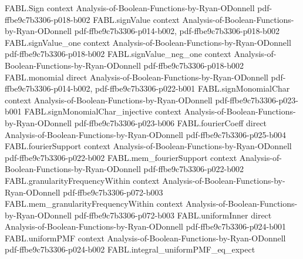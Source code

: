 \begin{theorem}
\label{FABL.FiniteFourierBasis.productTotalInfluence_eq_sum_order_mul_sq_fourierCoeff}
\leanok
{}
\proofstep
  {FABL.Sign}
  {context}
  {Analysis-of-Boolean-Functions-by-Ryan-ODonnell}
  {pdf-ffbe9c7b3306-p018-b002}
\proofstep
  {FABL.signValue}
  {context}
  {Analysis-of-Boolean-Functions-by-Ryan-ODonnell}
  {pdf-ffbe9c7b3306-p014-b002,
    pdf-ffbe9c7b3306-p018-b002}
\proofstep
  {FABL.signValue_one}
  {context}
  {Analysis-of-Boolean-Functions-by-Ryan-ODonnell}
  {pdf-ffbe9c7b3306-p018-b002}
\proofstep
  {FABL.signValue_neg_one}
  {context}
  {Analysis-of-Boolean-Functions-by-Ryan-ODonnell}
  {pdf-ffbe9c7b3306-p018-b002}
\proofstep
  {FABL.monomial}
  {direct}
  {Analysis-of-Boolean-Functions-by-Ryan-ODonnell}
  {pdf-ffbe9c7b3306-p014-b002,
    pdf-ffbe9c7b3306-p022-b001}
\proofstep
  {FABL.signMonomialChar}
  {context}
  {Analysis-of-Boolean-Functions-by-Ryan-ODonnell}
  {pdf-ffbe9c7b3306-p023-b001}
\proofstep
  {FABL.signMonomialChar_injective}
  {context}
  {Analysis-of-Boolean-Functions-by-Ryan-ODonnell}
  {pdf-ffbe9c7b3306-p023-b006}
\proofstep
  {FABL.fourierCoeff}
  {direct}
  {Analysis-of-Boolean-Functions-by-Ryan-ODonnell}
  {pdf-ffbe9c7b3306-p025-b004}
\proofstep
  {FABL.fourierSupport}
  {context}
  {Analysis-of-Boolean-Functions-by-Ryan-ODonnell}
  {pdf-ffbe9c7b3306-p022-b002}
\proofstep
  {FABL.mem_fourierSupport}
  {context}
  {Analysis-of-Boolean-Functions-by-Ryan-ODonnell}
  {pdf-ffbe9c7b3306-p022-b002}
\proofstep
  {FABL.granularityFrequencyWithin}
  {context}
  {Analysis-of-Boolean-Functions-by-Ryan-ODonnell}
  {pdf-ffbe9c7b3306-p072-b003}
\proofstep
  {FABL.mem_granularityFrequencyWithin}
  {context}
  {Analysis-of-Boolean-Functions-by-Ryan-ODonnell}
  {pdf-ffbe9c7b3306-p072-b003}
\proofstep
  {FABL.uniformInner}
  {direct}
  {Analysis-of-Boolean-Functions-by-Ryan-ODonnell}
  {pdf-ffbe9c7b3306-p024-b001}
\proofstep
  {FABL.uniformPMF}
  {context}
  {Analysis-of-Boolean-Functions-by-Ryan-ODonnell}
  {pdf-ffbe9c7b3306-p024-b002}
\proofstep
  {FABL.integral_uniformPMF_eq_expect}

\end{theorem}
